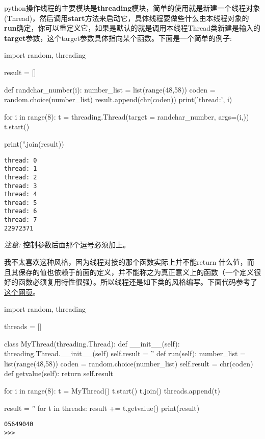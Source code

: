 \documentclass[12pt,oneside]{book}
\begin{document}
\begin{common-format}
python操作线程的主要模块是\textbf{threading}模块，简单的使用就是新建一个线程对象(Thread)，然后调用\textbf{start}方法来启动它，具体线程要做些什么由本线程对象的\textbf{run}确定，你可以重定义它，如果是默认的就是调用本线程Thread类新建是输入的\textbf{target}参数，这个target参数具体指向某个函数。下面是一个简单的例子: 

\begin{tcbpython}[]
import random, threading

result = []

def randchar_number(i):
    number_list = list(range(48,58))
    coden = random.choice(number_list)
    result.append(chr(coden))
    print('thread:', i)

for i in range(8):
    t = threading.Thread(target = randchar_number, args=(i,))
    t.start()

print(''.join(result))
\end{tcbpython}

\begin{Verbatim}
thread: 0
thread: 1
thread: 2
thread: 3
thread: 4
thread: 5
thread: 6
thread: 7
22972371
\end{Verbatim}


\emph{注意: } 控制参数后面那个逗号必须加上。

我不太喜欢这种风格，因为线程对接的那个函数实际上并不能return 什么值，而且其保存的值也依赖于前面的定义，并不能称之为真正意义上的函数（一个定义很好的函数必须复用特性很强）。所以线程还是如下类的风格编写。下面代码参考了 \href{http://www.ibm.com/developerworks/aix/library/au-threadingpython/index.html}{这个网页}。

\begin{tcbpython}[]
import random, threading

threads = []

class MyThread(threading.Thread):
    def __init__(self):
        threading.Thread.__init__(self)
        self.result = ''
    def run(self):
        number_list = list(range(48,58))
        coden = random.choice(number_list)
        self.result = chr(coden)
    def getvalue(self):
        return self.result


for i in range(8):
    t = MyThread()
    t.start()
    t.join()
    threads.append(t)

result = ''
for t in threads:
    result += t.getvalue()
print(result)
\end{tcbpython}

\begin{Verbatim}
05649040
>>> 
\end{Verbatim}


\end{common-format}
\end{document}
